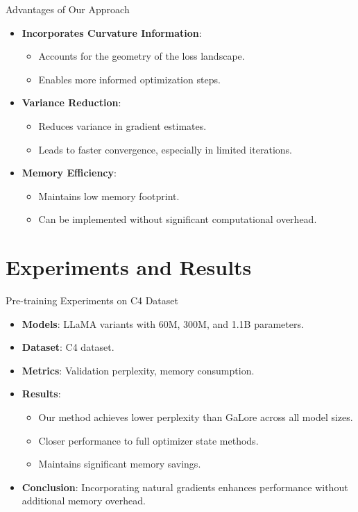 \documentclass{beamer}
\begin{document}
\begin{frame}{Advantages of Our Approach}
    \begin{itemize}
        \item \textbf{Incorporates Curvature Information}:
            \begin{itemize}
                \item Accounts for the geometry of the loss landscape.
                \item Enables more informed optimization steps.
            \end{itemize}
        \item \textbf{Variance Reduction}:
            \begin{itemize}
                \item Reduces variance in gradient estimates.
                \item Leads to faster convergence, especially in limited iterations.
            \end{itemize}
        \item \textbf{Memory Efficiency}:
            \begin{itemize}
                \item Maintains low memory footprint.
                \item Can be implemented without significant computational overhead.
            \end{itemize}
    \end{itemize}
\end{frame}

\section{Experiments and Results}

\begin{frame}{Pre-training Experiments on C4 Dataset}
    \begin{itemize}
        \item \textbf{Models}: LLaMA variants with 60M, 300M, and 1.1B parameters.
        \item \textbf{Dataset}: C4 dataset.
        \item \textbf{Metrics}: Validation perplexity, memory consumption.
        \item \textbf{Results}:
            \begin{itemize}
                \item Our method achieves lower perplexity than GaLore across all model sizes.
                \item Closer performance to full optimizer state methods.
                \item Maintains significant memory savings.
            \end{itemize}
        \item \textbf{Conclusion}: Incorporating natural gradients enhances performance without additional memory overhead.
    \end{itemize}
\end{frame}
\end{document}
